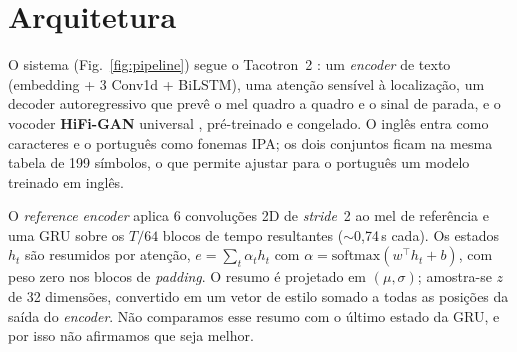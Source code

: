\documentclass[twocolumn,a4paper,10pt]{article}
\begin{document}
\section{Arquitetura}
O sistema (Fig.~\ref{fig:pipeline}) segue o Tacotron~2 \cite{shen,nvidiataco}: um \textit{encoder} de texto (embedding + 3 Conv1d + BiLSTM), uma atenção sensível à localização, um decoder autoregressivo que prevê o mel quadro a quadro e o sinal de parada, e o vocoder \textbf{HiFi-GAN} universal \cite{hifigan}, pré-treinado e congelado. O inglês entra como caracteres e o português como fonemas IPA; os dois conjuntos ficam na mesma tabela de 199 símbolos, o que permite ajustar para o português um modelo treinado em inglês.

O \textit{reference encoder} \cite{skerry} aplica 6 convoluções 2D de \textit{stride}~2 ao mel de referência e uma GRU sobre os $T/64$ blocos de tempo resultantes ($\sim$0,74\,s cada). Os estados $h_t$ são resumidos por atenção, $e=\sum_t \alpha_t h_t$ com $\alpha=\mathrm{softmax}(w^\top h_t+b)$, com peso zero nos blocos de \textit{padding}. O resumo é projetado em $(\mu,\sigma)$; amostra-se $z$ de 32 dimensões, convertido em um vetor de estilo somado a todas as posições da saída do \textit{encoder}. Não comparamos esse resumo com o último estado da GRU, e por isso não afirmamos que seja melhor.
\end{document}
